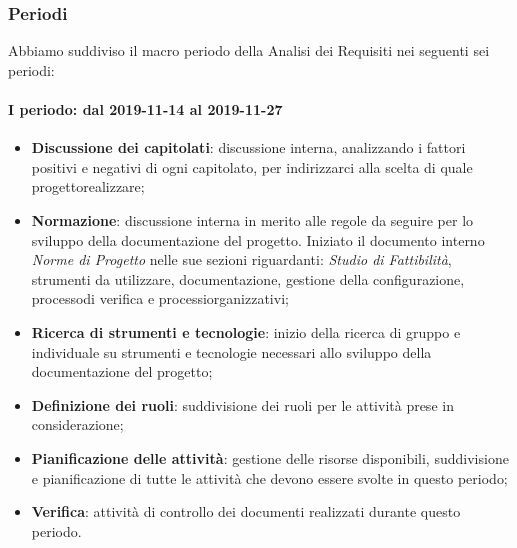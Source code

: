 \subsubsection{Periodi}
Abbiamo suddiviso il macro periodo della Analisi dei Requisiti nei seguenti sei periodi:
\paragraph*{I periodo: dal 2019-11-14 al 2019-11-27}
\begin{itemize}
	\item \textbf{Discussione dei capitolati}\glo: discussione interna, analizzando i fattori positivi e negativi di ogni capitolato\glo, per indirizzarci alla scelta di quale progetto\glosp realizzare;
	\item \textbf{Normazione}: discussione interna in merito alle regole da seguire per lo sviluppo della documentazione del progetto\glo. Iniziato il documento interno \textit{Norme di Progetto} nelle sue sezioni riguardanti: \textit{Studio di Fattibilità}, strumenti da utilizzare, documentazione, gestione della configurazione, processo\glosp di verifica e processi\glosp organizzativi;
	\item \textbf{Ricerca di strumenti e tecnologie}: inizio della ricerca di gruppo e individuale su strumenti e tecnologie necessari allo sviluppo della documentazione del progetto\glo;
	\item \textbf{Definizione dei ruoli}: suddivisione dei ruoli per le attività prese in considerazione; 
	\item \textbf{Pianificazione delle attività}: gestione delle risorse disponibili, suddivisione e pianificazione di tutte le attività che devono essere svolte in questo periodo;
	\item \textbf{Verifica}: attività di controllo dei documenti realizzati durante questo periodo.
\end{itemize}

